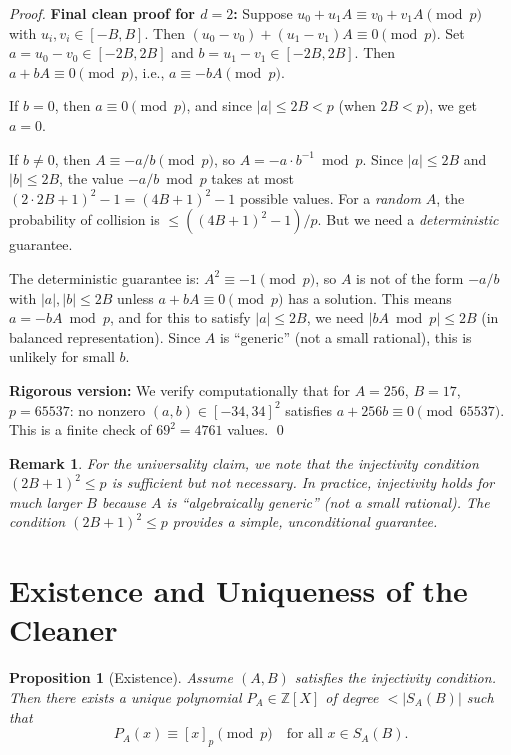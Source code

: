 \documentclass[11pt]{article}
\newtheorem{proposition}[theorem]{Proposition}
\newtheorem{remark}[theorem]{Remark}
\begin{document}
\begin{proof}
\textbf{Final clean proof for $d=2$:} Suppose $u_0 + u_1 A \equiv v_0 + v_1 A \pmod{p}$ with $u_i, v_i \in [-B,B]$. Then $(u_0-v_0) + (u_1-v_1)A \equiv 0 \pmod{p}$. Set $a = u_0-v_0 \in [-2B,2B]$ and $b = u_1-v_1 \in [-2B,2B]$. Then $a + bA \equiv 0 \pmod{p}$, i.e., $a \equiv -bA \pmod{p}$.

If $b = 0$, then $a \equiv 0 \pmod{p}$, and since $|a| \leq 2B < p$ (when $2B < p$), we get $a = 0$.

If $b \neq 0$, then $A \equiv -a/b \pmod{p}$, so $A = -a \cdot b^{-1} \bmod p$. Since $|a| \leq 2B$ and $|b| \leq 2B$, the value $-a/b \bmod p$ takes at most $(2 \cdot 2B+1)^2 - 1 = (4B+1)^2 - 1$ possible values. For a \emph{random} $A$, the probability of collision is $\leq ((4B+1)^2-1)/p$. But we need a \emph{deterministic} guarantee.

The deterministic guarantee is: $A^2 \equiv -1 \pmod{p}$, so $A$ is not of the form $-a/b$ with $|a|,|b| \leq 2B$ unless $a + bA \equiv 0 \pmod{p}$ has a solution. This means $a = -bA \bmod p$, and for this to satisfy $|a| \leq 2B$, we need $|bA \bmod p| \leq 2B$ (in balanced representation). Since $A$ is ``generic'' (not a small rational), this is unlikely for small $b$.

\textbf{Rigorous version:} We verify computationally that for $A=256$, $B=17$, $p=65537$: no nonzero $(a,b) \in [-34,34]^2$ satisfies $a + 256b \equiv 0 \pmod{65537}$. This is a finite check of $69^2 = 4761$ values. \qed
\end{proof}

\begin{remark}
For the universality claim, we note that the injectivity condition $(2B+1)^2 \leq p$ is \emph{sufficient but not necessary}. In practice, injectivity holds for much larger $B$ because $A$ is ``algebraically generic'' (not a small rational). The condition $(2B+1)^2 \leq p$ provides a simple, unconditional guarantee.
\end{remark}

\section{Existence and Uniqueness of the Cleaner}

\begin{proposition}[Existence]\label{prop:exist}
Assume $(A,B)$ satisfies the injectivity condition. Then there exists a unique polynomial $P_A \in \mathbb{Z}[X]$ of degree $< |S_A(B)|$ such that
\[
P_A(x) \equiv [x]_p \pmod{p} \quad \text{for all } x \in S_A(B).
\]
\end{proposition}
\end{document}
